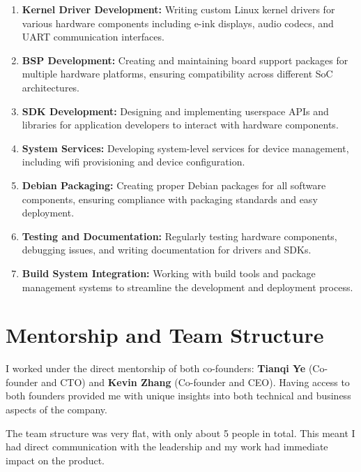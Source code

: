 \documentclass[12pt,a4paper]{report}
\begin{document}
\begin{enumerate}[itemsep=0.3cm]
    \item \textbf{Kernel Driver Development:} Writing custom Linux kernel drivers for various hardware components including e-ink displays, audio codecs, and UART communication interfaces.

    \item \textbf{BSP Development:} Creating and maintaining board support packages for multiple hardware platforms, ensuring compatibility across different SoC architectures.

    \item \textbf{SDK Development:} Designing and implementing userspace APIs and libraries for application developers to interact with hardware components.

    \item \textbf{System Services:} Developing system-level services for device management, including wifi provisioning and device configuration.

    \item \textbf{Debian Packaging:} Creating proper Debian packages for all software components, ensuring compliance with packaging standards and easy deployment.

    \item \textbf{Testing and Documentation:} Regularly testing hardware components, debugging issues, and writing documentation for drivers and SDKs.

    \item \textbf{Build System Integration:} Working with build tools and package management systems to streamline the development and deployment process.
\end{enumerate}

\section{Mentorship and Team Structure}

I worked under the direct mentorship of both co-founders: \textbf{Tianqi Ye} (Co-founder and CTO) and \textbf{Kevin Zhang} (Co-founder and CEO). Having access to both founders provided me with unique insights into both technical and business aspects of the company.

\vspace{0.3cm}

The team structure was very flat, with only about 5 people in total. This meant I had direct communication with the leadership and my work had immediate impact on the product.
\end{document}
